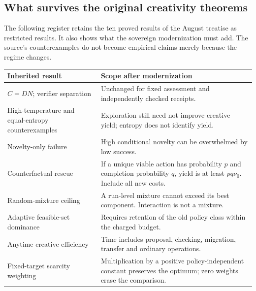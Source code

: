 \documentclass[11pt]{article}
\theoremstyle{definition}\newtheorem{definition}[theorem]{Definition}\newtheorem{conjecture}[theorem]{Conjecture}\newtheorem{example}[theorem]{Example}
\begin{document}
\subsection{What survives the original creativity theorems}
The following register retains the ten proved results of the August treatise as restricted results. It also shows what the sovereign modernization must add. The source's counterexamples do not become empirical claims merely because the regime changes.
\begin{center}\small
\begin{tabularx}{\linewidth}{@{}p{.31\linewidth}X@{}}\toprule
Inherited result & Scope after modernization\\\midrule
$C=DN$; verifier separation & Unchanged for fixed assessment and independently checked receipts.\\
High-temperature and equal-entropy counterexamples & Exploration still need not improve creative yield; entropy does not identify yield.\\
Novelty-only failure & High conditional novelty can be overwhelmed by low success.\\
Counterfactual rescue & If a unique viable action has probability $p$ and completion probability $q$, yield is at least $pq\nu_0$. Include all new costs.\\
Random-mixture ceiling & A run-level mixture cannot exceed its best component. Interaction is not a mixture.\\
Adaptive feasible-set dominance & Requires retention of the old policy class within the charged budget.\\
Anytime creative efficiency & Time includes proposal, checking, migration, transfer and ordinary operations.\\
Fixed-target scarcity weighting & Multiplication by a positive policy-independent constant preserves the optimum; zero weights erase the comparison.\\\bottomrule
\end{tabularx}
\end{center}
\end{document}
